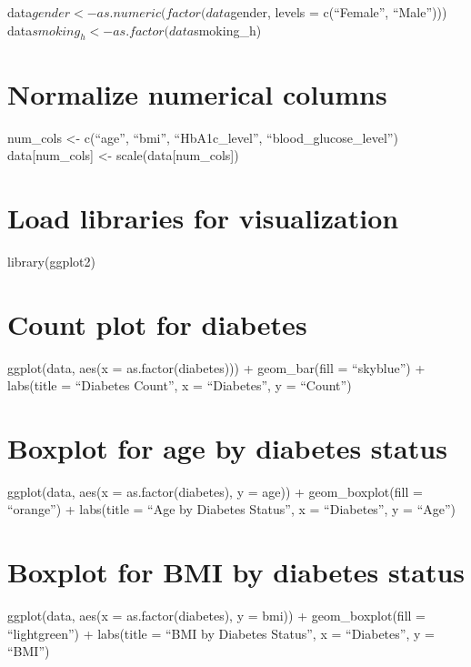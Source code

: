 \documentclass[
]{article}
\begin{document}
data\(gender <- as.numeric(factor(data\)gender, levels = c(``Female'',
``Male''))) data\(smoking_h <- as.factor(data\)smoking\_h)

\hypertarget{normalize-numerical-columns}{%
\section{Normalize numerical
columns}\label{normalize-numerical-columns}}

num\_cols \textless- c(``age'', ``bmi'', ``HbA1c\_level'',
``blood\_glucose\_level'') data{[}num\_cols{]} \textless-
scale(data{[}num\_cols{]})

\hypertarget{load-libraries-for-visualization}{%
\section{Load libraries for
visualization}\label{load-libraries-for-visualization}}

library(ggplot2)

\hypertarget{count-plot-for-diabetes}{%
\section{Count plot for diabetes}\label{count-plot-for-diabetes}}

ggplot(data, aes(x = as.factor(diabetes))) + geom\_bar(fill =
``skyblue'') + labs(title = ``Diabetes Count'', x = ``Diabetes'', y =
``Count'')

\hypertarget{boxplot-for-age-by-diabetes-status}{%
\section{Boxplot for age by diabetes
status}\label{boxplot-for-age-by-diabetes-status}}

ggplot(data, aes(x = as.factor(diabetes), y = age)) + geom\_boxplot(fill
= ``orange'') + labs(title = ``Age by Diabetes Status'', x =
``Diabetes'', y = ``Age'')

\hypertarget{boxplot-for-bmi-by-diabetes-status}{%
\section{Boxplot for BMI by diabetes
status}\label{boxplot-for-bmi-by-diabetes-status}}

ggplot(data, aes(x = as.factor(diabetes), y = bmi)) + geom\_boxplot(fill
= ``lightgreen'') + labs(title = ``BMI by Diabetes Status'', x =
``Diabetes'', y = ``BMI'')
\end{document}
